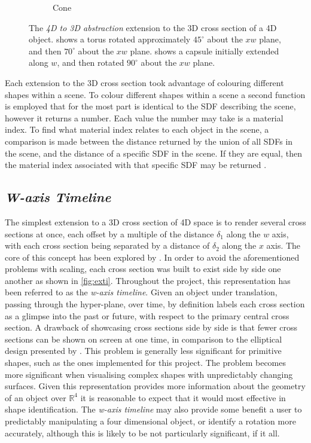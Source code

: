 \documentclass{l4proj}
\begin{document}
\begin{figure}[H]
\begin{subfigure}[b]{0.33\textwidth}
    \caption{Cone}
    \label{fig:rep_4-3-cone}
  \end{subfigure}
  \caption{
    The \emph{4D to 3D abstraction} extension to the 3D cross section of a 4D object.
     shows a torus rotated approximately $45^{\circ}$ about the $xw$ plane, and then $70^{\circ}$ about the $xw$ plane.
     shows a capsule initially extended along $w$, and then rotated $90^{\circ}$ about the $xw$ plane.
    }
  \label{fig:rep_4-3}
\end{figure}

Each extension to the 3D cross section took advantage of colouring different shapes within a scene. To colour different shapes within a scene a second function is employed that for the most part is identical to the SDF describing the scene, however it returns a number. Each value the number may take is a material index. To find what material index relates to each object in the scene, a comparison is made between the distance returned by the union of all SDFs in the scene, and the distance of a specific SDF in the scene. If they are equal, then the material index associated with that specific SDF may be returned \citep{the_art_of_code_setting_2021}.

\subsection{\textit{W-axis Timeline}}
The simplest extension to a 3D cross section of 4D space is to render several cross sections at once, each offset by a multiple of the distance $\delta_1$ along the \(w\) axis, with each cross section being separated by a distance of $\delta_2$ along the \(x\) axis. 
The core of this concept has been explored by \citet{kageyama_visualization_2015}. In order to avoid the aforementioned problems with scaling, each cross section was built to exist side by side one another as shown in \cref{fig:exti}. 
Throughout the project, this representation has been referred to as the \textit{w-axis timeline}. Given an object under translation, passing through the hyper-plane, over time, by definition labels each cross section as a glimpse into the past or future, with respect to the primary central cross section.
A drawback of showcasing cross sections side by side is that fewer cross sections can be shown on screen at one time, in comparison to the elliptical design presented by \citet{kageyama_visualization_2015}. This problem is generally less significant for primitive shapes, such as the ones implemented for this project. The problem becomes more significant when visualising complex shapes with unpredictably changing surfaces.
Given this representation provides more information about the geometry of an object over $\mathbb{R}^4$ it is reasonable to expect that it would most effective in shape identification. The \textit{w-axis timeline} may also provide some benefit a user to predictably manipulating a four dimensional object, or identify a rotation more accurately, although this is likely to be not particularly significant, if it all.
\end{document}
